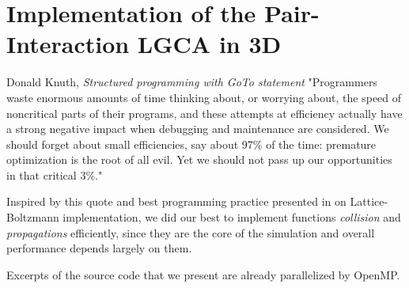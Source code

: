 \chapter{Implementation of the Pair-Interaction LGCA in 3D}


\begin{chapquote}{Donald Knuth, \textit{Structured programming with GoTo statement}}
"Programmers waste enormous amounts of time thinking about, or worrying about, the speed of noncritical parts of their programs, and these attempts at efficiency actually have a strong negative impact when debugging and maintenance are considered. We should forget about small efficiencies, say about 97\% of the time: premature optimization is the root of all evil. Yet we should not pass up our opportunities in that critical 3\%."
\end{chapquote}
%


Inspired by this quote and best programming practice presented in \cite{lbm} on Lattice-Boltzmann implementation, we did our best to implement functions \textit{collision} and \textit{propagations} efficiently, since they are the core of the simulation and overall performance depends largely on them.

Excerpts of the source code that we present are already parallelized by OpenMP.

